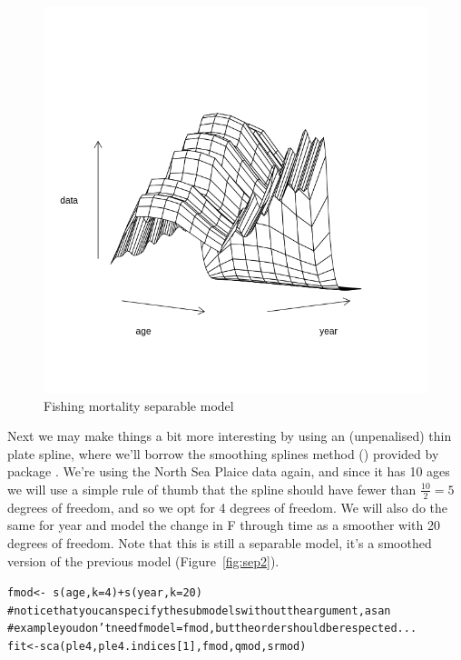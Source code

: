 \documentclass[a4paper,english,10pt]{article}\usepackage[]{graphicx}\usepackage[]{color}
\makeatletter
\newcommand{\hlnum}[1]{\textcolor[rgb]{0.063,0.58,0.627}{#1}}%
\newcommand{\hlcom}[1]{\textcolor[rgb]{0.588,0.588,0.588}{#1}}%
\newcommand{\hlopt}[1]{\textcolor[rgb]{0.196,0.196,0.196}{#1}}%
\newcommand{\hlstd}[1]{\textcolor[rgb]{0.196,0.196,0.196}{#1}}%
\newcommand{\hlkwb}[1]{\textcolor[rgb]{0.627,0,0.314}{#1}}%
\newcommand{\hlkwc}[1]{\textcolor[rgb]{0,0.631,0.314}{#1}}%
\newcommand{\hlkwd}[1]{\textcolor[rgb]{0.78,0.227,0.412}{#1}}%
\newenvironment{kframe}{%
 \def\at@end@of@kframe{}%
 \ifinner\ifhmode%
  \def\at@end@of@kframe{\end{minipage}}%
  \begin{minipage}{\columnwidth}%
 \fi\fi%
 \def\FrameCommand##1{\hskip\@totalleftmargin \hskip-\fboxsep
 \colorbox{shadecolor}{##1}\hskip-\fboxsep
     \hskip-\linewidth \hskip-\@totalleftmargin \hskip\columnwidth}%
 \MakeFramed {\advance\hsize-\width
   \@totalleftmargin\z@ \linewidth\hsize
   \@setminipage}}%
 {\par\unskip\endMakeFramed%
 \at@end@of@kframe}
\newenvironment{knitrout}{}{} %
\makeatother
\begin{document}
\begin{knitrout}
\color{fgcolor}\begin{figure}[H]

{\centering \includegraphics[width=.9\linewidth]{figure/sep1-1} 

}

\caption[Fishing mortality separable model]{Fishing mortality separable model}\label{fig:sep1}
\end{figure}


\end{knitrout}

Next we may make things a bit more interesting by using an (unpenalised) thin plate spline, where we'll borrow the smoothing splines method () provided by package \href{http://cran.r-project.org/web/packages/mgcv/}{}. We're using the North Sea Plaice data again, and since it has 10 ages we will use a simple rule of thumb that the spline should have fewer than $\frac{10}{2} = 5$ degrees of freedom, and so we opt for 4 degrees of freedom. We will also do the same for year and model the change in F through time as a smoother with 20 degrees of freedom. Note that this is still a separable model, it's a smoothed version of the previous model (Figure~\ref{fig:sep2}).

\begin{knitrout}
\color{fgcolor}\begin{kframe}
\begin{alltt}
\hlstd{fmod} \hlkwb{<-} \hlopt{~}\hlkwd{s}\hlstd{(age,} \hlkwc{k} \hlstd{=} \hlnum{4}\hlstd{)} \hlopt{+} \hlkwd{s}\hlstd{(year,} \hlkwc{k} \hlstd{=} \hlnum{20}\hlstd{)}
\hlcom{# notice that you can specify the submodels without the argument, as an}
\hlcom{# example you don't need fmodel=fmod, but the order should be respected...}
\hlstd{fit} \hlkwb{<-} \hlkwd{sca}\hlstd{(ple4, ple4.indices[}\hlnum{1}\hlstd{], fmod, qmod, srmod)}
\end{alltt}
\end{kframe}
\end{knitrout}
\end{document}
